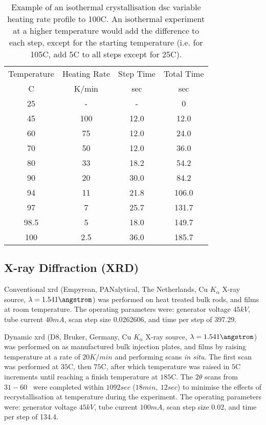 \begin{table}[h]
	\centering
	\caption{Example of an isothermal crystallisation \acrshort{dsc} variable heating rate profile to 100\degree C. An isothermal experiment at a higher temperature would add the difference to each step, except for the starting temperature (i.e. for 105\degree C, add 5\degree C to all steps except for 25\degree C).}
	\begin{tabular}{cccc}
		\toprule
		Temperature & Heating Rate & Step Time & Total Time \\
		\degree C   & K/min & sec  & sec \\
		\midrule
		25   & -     & -    & 0          \\
		45   & 100   & 12.0 & 12.0       \\
		60   & 75    & 12.0 & 24.0       \\
		70   & 50    & 12.0 & 36.0       \\
		80   & 33    & 18.2 & 54.2       \\
		90   & 20    & 30.0 & 84.2       \\
		94   & 11    & 21.8 & 106.0      \\
		97   & 7     & 25.7 & 131.7      \\
		98.5 & 5     & 18.0 & 149.7      \\
		100  & 2.5   & 36.0 & 185.7      \\
		\bottomrule  
	\end{tabular}
	\label{tab:RampingDSC}
\end{table} 

\subsection{X-ray Diffraction (XRD)}
Conventional \acrshort{xrd} (Empyrean, PANalytical, The Netherlands, Cu $K_{\alpha}$ X-ray source, $\lambda = 1.541 \angstrom$) was performed on heat treated bulk rods, and films at room temperature. 
The operating parameters were: generator voltage $45 kV$, tube current $40 mA$, scan step size 0.0262606, and time per step of 397.29. 

Dynamic \acrshort{xrd} (D8, Bruker, Germany, Cu $K_{\alpha}$ X-ray source, $\lambda = 1.541 \angstrom$) was performed on as manufactured bulk injection plates, and films by raising temperature at a rate of $20 K/min$ and performing scans \textit{in situ}. The first scan was performed at $35$\degree C, then $75$\degree C, after which temperature was raised in $5$\degree C increments until reaching a finish temperature at $185$\degree C. The $2 \theta$ scans from $31 - 60$\degree~ were completed within $1092 sec$ ($18min,~ 12sec$) to minimise the effects of recrystallisation at temperature during the experiment.
The operating parameters were: generator voltage $45 kV$, tube current $100 mA$, scan step size 0.02, and time per step of 134.4. 

